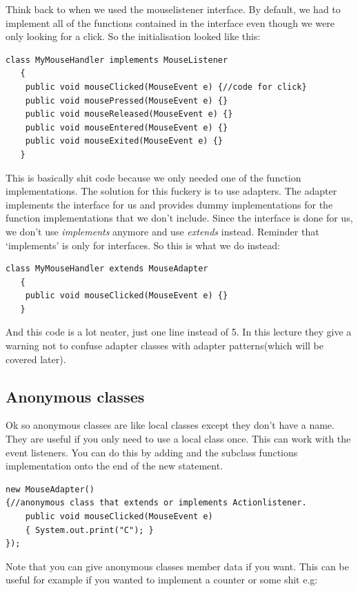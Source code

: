 \documentclass{article}
\begin{document}
Think back to when we used the mouselistener interface. By default, we had to implement all of the functions
contained in the interface even though we were only looking for a click. So the initialisation looked like this:

\begin{lstlisting}
class MyMouseHandler implements MouseListener
   {
	public void mouseClicked(MouseEvent e) {//code for click}
	public void mousePressed(MouseEvent e) {}
	public void mouseReleased(MouseEvent e) {}
	public void mouseEntered(MouseEvent e) {}
	public void mouseExited(MouseEvent e) {}
   }
\end{lstlisting}
This is basically shit code because we only needed one of the function implementations. The solution for this
fuckery is to use adapters. The adapter implements the interface for us and provides dummy implementations 
for the function implementations that we don't include. Since the interface is done for us, we don't use 
\emph{implements} anymore and use \emph{extends} instead. Reminder that `implements' is only for interfaces.
So this is what we do instead:

\begin{lstlisting}
class MyMouseHandler extends MouseAdapter
   {
	public void mouseClicked(MouseEvent e) {}
   }
\end{lstlisting}
And this code is a lot neater, just one line instead of 5. In this lecture they give a warning not to confuse 
adapter classes with adapter patterns(which will be covered later).

\subsection{Anonymous classes}

Ok so anonymous classes are like local classes except they don't have a name. They are useful if you only
need to use a local class once. This can work with the event listeners. You can do this by adding {} and the 
subclass functions implementation onto the end of the new statement.

\begin{lstlisting}
new MouseAdapter()
{//anonymous class that extends or implements Actionlistener.
	public void mouseClicked(MouseEvent e)
	{ System.out.print("C"); } 
});
\end{lstlisting}
Note that you can give anonymous classes member data if you want. This can be useful for example if you 
wanted to implement a counter or some shit e.g:
\end{document}
